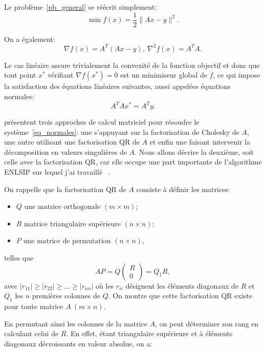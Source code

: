 Le problème~\eqref{pb_general} se réécrit simplement:
\begin{equation}\label{pb_lineaire}
    \min f(x) = \dfrac{1}{2} \|Ax - y\|^2.
\end{equation}

On a également: 
\[
\nabla f(x) = A^T(Ax-y), \ \nabla^2f(x)=A^TA.
\]

Le cas linéaire assure trivialement la convexité de la fonction objectif et donc que tout point $x^*$ vérifiant $\nabla f(x^*)=0$ est un 
minimiseur global de $f$, ce qui impose la satisfaction des équations linéaires suivantes, aussi appelées équations normales: 
\begin{equation}\label{eq_normales}
    A^TAx^*=A^Ty.
\end{equation}

\citet{nocewrig99} présentent trois approches de calcul matriciel pour résoudre le système~\eqref{eq_normales}: une s'appuyant sur la factorisation de 
Cholesky de $A$, une autre utilisant une factorisation QR de $A$ et enfin une faisant intervenir la décomposition en valeurs singulières de $A$. 
Nous allons décrire la deuxième, soit celle avec la factorisation QR, car elle occupe une part importante de l'algorithme ENLSIP sur lequel j'ai travaillé ~\cite{lindwedin88}.


On rappelle que la factorisation QR de $A$ consiste à définir les matrices:
\begin{itemize}
    \item $Q\text{ une matrice orthogonale } (m\times m)$;
    \item $R$ matrice triangulaire supérieure $(n \times n)$; 
    \item $P \text{ une matrice de permutation } (n \times n)$,
\end{itemize}
telles que
\begin{equation}\label{fact_qr}
AP = Q 
\begin{pmatrix} 
R \\ 
0
\end{pmatrix} = Q_1R,
\end{equation}
avec $|r_{11}| \geq |r_{22}| \geq \ldots \geq |r_{nn}|$ où les $r_{ii}$ désignent les éléments diagonaux de $R$ et $Q_1$ les $n$ premières colonnes de $Q$.
On montre que cette factorisation QR existe pour toute matrice $A\ (m\times n)$.

En permutant ainsi les colonnes de la matrice $A$, on peut déterminer son rang en calculant celui de $R$. En effet, étant 
triangulaire supérieure et à éléments diagonaux décroissants en valeur absolue, on a:

